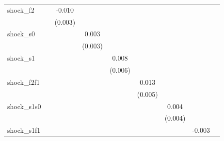 {\begin{tabular}{l*{8}{c}}
\addlinespace
shock\_f2    &                     &      -0.010\sym{***}&                     &                     &                     &                     &                     &                     \\
            &                     &     (0.003)         &                     &                     &                     &                     &                     &                     \\
\addlinespace
shock\_s0    &                     &                     &       0.003         &                     &                     &                     &                     &                     \\
            &                     &                     &     (0.003)         &                     &                     &                     &                     &                     \\
\addlinespace
shock\_s1    &                     &                     &                     &       0.008         &                     &                     &                     &                     \\
            &                     &                     &                     &     (0.006)         &                     &                     &                     &                     \\
\addlinespace
shock\_f2f1  &                     &                     &                     &                     &       0.013\sym{**} &                     &                     &                     \\
            &                     &                     &                     &                     &     (0.005)         &                     &                     &                     \\
\addlinespace
shock\_s1s0  &                     &                     &                     &                     &                     &       0.004         &                     &                     \\
            &                     &                     &                     &                     &                     &     (0.004)         &                     &                     \\
\addlinespace
shock\_s1f1  &                     &                     &                     &                     &                     &                     &      -0.003         &                     \\

\end{tabular}}
